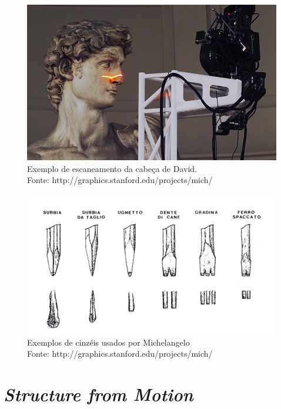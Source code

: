 \documentclass[table, usenames, svgnames, xcolor=dvipsnames]{beamer}
\begin{document}
\begin{frame} 
	\begin{center}
		\begin{figure}[!h]
			\centering
			\includegraphics[width=0.7\linewidth]{figs/scanner-head-and-david-head-s.jpg}
			\caption{%
			Exemplo de escaneamento da cabeça de David. \\
			\tiny{Fonte: http://graphics.stanford.edu/projects/mich/}
			}
		\end{figure}
	\end{center}
\end{frame}

\begin{frame} 
	\begin{center}
		\centering
		\begin{figure}[!h]
			\includegraphics[width=0.7\linewidth]{figs/ferramentasMich.png}
			\caption{%
			Exemplos de cinzéis usados por Michelangelo \\
			\tiny{Fonte: http://graphics.stanford.edu/projects/mich/}
			}
		\end{figure}
	\end{center}
\end{frame}

\section{\protect\emph{Structure from Motion}}
\end{document}
